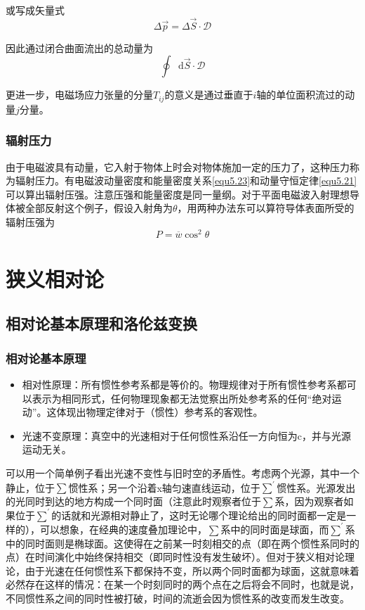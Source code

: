 \documentclass[UTF8]{ctexart}
\newcommand*{\dif}{\mathop{}\!\mathrm{d}}
\begin{document}
\noindent 或写成矢量式
\begin{equation}
    \Delta \vec{p} = \Delta \vec{S} \cdot \mathbf{\mathscr{D}}
\end{equation}

\noindent 因此通过闭合曲面流出的总动量为
\begin{equation}
    \oint \dif \vec{S} \cdot \mathbf{\mathscr{D}}
\end{equation}

\noindent 更进一步，电磁场应力张量的分量$T_{ij}$的意义是通过垂直于$i$轴的单位面积流过的动量$j$分量。

    \subsubsection{辐射压力}
    由于电磁波具有动量，它入射于物体上时会对物体施加一定的压力了，这种压力称为辐射压力。有电磁波动量密度和能量密度关系\autoref{equ5.23}和动量守恒定律\autoref{equ5.21}可以算出辐射压强。注意压强和能量密度是同一量纲。对于平面电磁波入射理想导体被全部反射这个例子，假设入射角为$\theta$，用两种办法东可以算符导体表面所受的辐射压强为
    \begin{equation}
        P = \overline{w} \cos^2 \theta
    \end{equation}

    \section{狭义相对论}
    \subsection{相对论基本原理和洛伦兹变换}
    \subsubsection{相对论基本原理}
    \begin{itemize}
        \item 相对性原理：所有惯性参考系都是等价的。物理规律对于所有惯性参考系都可以表示为相同形式，任何物理现象都无法觉察出所处参考系的任何“绝对运动”。这体现出物理定律对于（惯性）参考系的客观性。
        \item 光速不变原理：真空中的光速相对于任何惯性系沿任一方向恒为c，并与光源运动无关。
    \end{itemize}

    可以用一个简单例子看出光速不变性与旧时空的矛盾性。考虑两个光源，其中一个静止，位于$\sum$惯性系；另一个沿着x轴匀速直线运动，位于$\sum^{\prime}$惯性系。光源发出的光同时到达的地方构成一个同时面（注意此时观察者位于$\sum$系，因为观察者如果位于$\sum^{\prime}$的话就和光源相对静止了，这时无论哪个理论给出的同时面都一定是一样的），可以想象，在经典的速度叠加理论中，$\sum$系中的同时面是球面，而$\sum^{\prime}$系中的同时面则是椭球面。这使得在之前某一时刻相交的点（即在两个惯性系同时的点）在时间演化中始终保持相交（即同时性没有发生破坏）。但对于狭义相对论理论，由于光速在任何惯性系下都保持不变，所以两个同时面都为球面，这就意味着必然存在这样的情况：在某一个时刻同时的两个点在之后将会不同时，也就是说，不同惯性系之间的同时性被打破，时间的流逝会因为惯性系的改变而发生改变。
\end{document}
